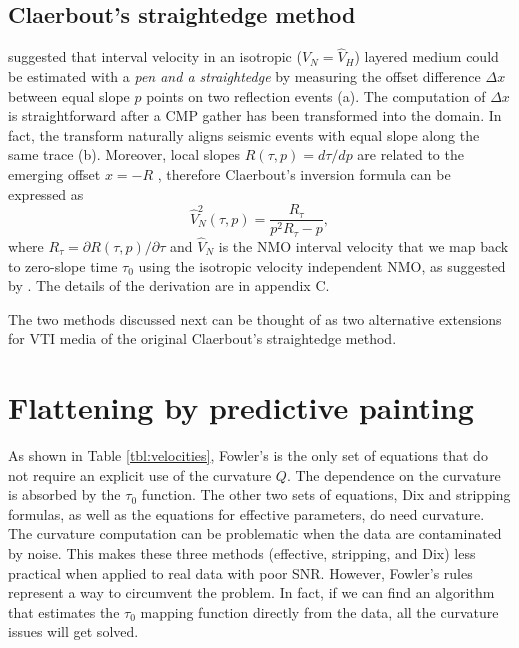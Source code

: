 \subsection{Claerbout's straightedge method}
\cite{Claerbout.sep.14.13} suggested that interval velocity in an
isotropic (\mbox{$\hat{V}_N=\hat{V}_H$}) layered medium could be
estimated with a \textit{pen and a straightedge} by measuring the
offset difference $\Delta x$ between equal slope $p$ points on two
reflection events (a).  The computation of $\Delta x$
is straightforward after a CMP gather has been transformed into the
\taup domain. In fact, the \taup transform naturally aligns seismic
events with equal slope along the same trace
(b). Moreover, local slopes $R(\tau,p)=d\tau/dp$ are
related to the emerging offset $x=-R$  \citep{baan:719} , therefore
Claerbout's inversion formula can be expressed as
\begin{equation}
\hat{V}_N^{2}(\tau,p)=\dfrac{R_{\tau}}{p^2R_{\tau}-p},  \label{eqn:Clarebout}
\end{equation}
where $R_{\tau}=\partial R(\tau,p)/\partial \tau$ and $\hat{V}_N$ is the
NMO interval velocity that we map back to zero-slope time $\tau_0$ using the
isotropic velocity independent \taup NMO, as suggested by \cite{fomel:S139}. The details of the derivation are in appendix C.

The two methods discussed next can be thought of as two alternative
extensions for VTI media of the original Claerbout's straightedge
method.




\section{Flattening by predictive painting}

As shown in Table \ref{tbl:velocities}, Fowler's is the only set of
equations that do not require an explicit use of the curvature
$Q$. The dependence on the curvature is absorbed by the $\tau_0$
function. The other two sets of equations, Dix and stripping formulas,
as well as the equations for effective parameters, do need
curvature. The curvature computation can be problematic when the data
are contaminated by noise. This makes these three methods (effective,
stripping, and Dix) less practical when applied to real data with poor
SNR. However, Fowler's rules represent a way to circumvent the
problem. In fact, if we can find an algorithm that estimates the $\tau_0$
mapping function directly from the data, all the curvature issues
will get solved.

